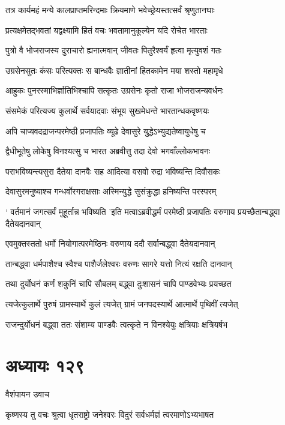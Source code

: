 \twolineshloka
{तत्र कार्यमहं मन्ये कालप्राप्तमरिन्दमाः}
{क्रियमाणे भवेच्छ्रेयस्तत्सर्वं श्रृणुतानघाः}


\twolineshloka
{प्रत्यक्षमेतद्भवतां यद्वक्ष्यामि हितं वचः}
{भवतामानुकूल्येन यदि रोचेत भारताः}


\twolineshloka
{पुत्रो वै भोजराजस्य दुराचारो ह्यनात्मवान्}
{जीवतः पितुरैश्वर्यं हृत्वा मृत्युवशं गतः}


\twolineshloka
{उग्रसेनसुतः कंसः परित्यक्तः स बान्धवैः}
{ज्ञातीनां हितकामेन मया शस्तो महामृधे}


\twolineshloka
{आहुकः पुनरस्माभिर्ज्ञातिभिश्चापि सत्कृतः}
{उग्रसेनः कृतो राजा भोजराजन्यवर्धनः}


\twolineshloka
{संसमेकं परित्यज्य कुलार्थे सर्वयादवाः}
{संभूय सुखमेधन्ते भारतान्धकवृष्णयः}


\twolineshloka
{अपि चाप्यवदद्राजन्परमेष्ठी प्रजापतिः}
{व्यूढे देवासुरे युद्धेऽभ्युद्यतेष्वायुधेषु च}


\twolineshloka
{द्वैधीभूतेषु लोकेषु विनश्यत्सु च भारत}
{अब्रवीत्तु तदा देवो भगवाँल्लोकभावनः}


\twolineshloka
{पराभविष्यन्त्यसुरा दैतेया दानवैः सह}
{आदित्या वसवो रुद्रा भविष्यन्ति दिवौसकः}


\twolineshloka
{देवासुरमनुष्याश्च गन्धर्वोरगराक्षसाः}
{अस्मिन्युद्धे सुसंक्रुद्धा हनिष्यन्ति परस्परम्}


\threelineshloka
{` वर्तमानं जगत्सर्वं मुहूर्तान्न भविष्यति}
{'इति मत्वाऽब्रवीद्धर्मं परमेष्ठी प्रजापतिः}
{वरुणाय प्रयच्छैतान्बद्ध्वा दैतेयदानवान्}


\twolineshloka
{एवमुक्तस्ततो धर्मो नियोगात्परमेष्ठिनः}
{वरुणाय ददौ सर्वान्बद्ध्वा दैतेयदानवान्}


\twolineshloka
{तान्बद्ध्वा धर्मपाशैश्च स्वैश्च पाशैर्जलेश्वरः}
{वरुणः सागरे यत्तो नित्यं रक्षति दानवान्}


\twolineshloka
{तथा दुर्योधनं कर्णं शकुनिं चापि सौबलम्}
{बद्ध्वा दुःशासनं चापि पाण्डवेभ्यः प्रयच्छत}


\twolineshloka
{त्यजेत्कुलार्थे पुरुषं ग्रामस्यार्थे कुलं त्यजेत्}
{ग्रामं जनपदस्यार्थे आत्मार्थे पृथिवीं त्यजेत्}


\twolineshloka
{राजन्दुर्योधनं बद्ध्वा ततः संशाम्य पाण्डवैः}
{त्वत्कृते न विनश्येयुः क्षत्रियाः क्षत्रियर्षभ}


\chapter{अध्यायः १२९}
\twolineshloka
{वैशंपायन उवाच}
{}


\twolineshloka
{कृष्णस्य तु वचः श्रुत्वा धृतराष्ट्रो जनेश्वरः}
{विदुरं सर्वधर्मज्ञं त्वरमाणोऽभ्यभाषत}


